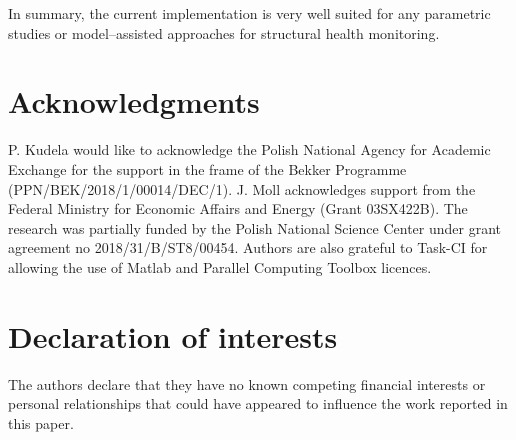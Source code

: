 \documentclass[preprint,12pt]{elsarticle}
\begin{document}
	In summary, the current implementation is very well suited for any parametric studies or model--assisted approaches for structural health monitoring.
	
	
	\section*{Acknowledgments}
	P. Kudela would like to acknowledge the Polish National Agency for Academic Exchange for the support in the frame of the Bekker Programme (PPN/BEK/2018/1/00014/DEC/1). J. Moll acknowledges support from the Federal Ministry for
	Economic Affairs and Energy (Grant 03SX422B). The research was partially funded by the Polish National Science Center under grant agreement no 2018/31/B/ST8/00454. Authors are also grateful to Task-CI for allowing the use of Matlab and Parallel Computing Toolbox licences. 

	\section*{Declaration of interests}
	The authors declare that they have no known competing financial interests or personal relationships that could have appeared to influence the work reported in this paper.
	
	
    
	{}
\end{document}
